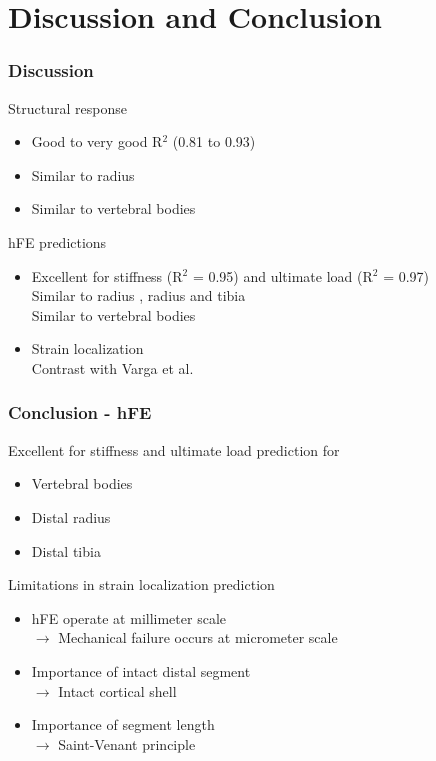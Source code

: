 \documentclass[xcolor=table,11pt]{beamer}
\begin{document}
	
	\section{Discussion and Conclusion}

	\begin{frame}
		\frametitle{Discussion}

		Structural response
		\begin{itemize}
			\item Good to very good R$^2$ (0.81 to 0.93)
			\item Similar to radius \cite{p8}\cite{p9}
			\item Similar to vertebral bodies \cite{p10}\cite{p11}
		\end{itemize}

		\vfill

		hFE predictions
		\begin{itemize}
			\item Excellent for stiffness (R$^2$ = 0.95) and ultimate load (R$^2$ = 0.97)\\Similar to radius \cite{p9}, radius and tibia \cite{p13}\\Similar to vertebral bodies \cite{p10}
			\item Strain localization\\Contrast with Varga et al. \cite{p7}
		\end{itemize}

	\end{frame}
	
	\begin{frame}
		\frametitle{Conclusion - hFE}
		Excellent for stiffness and ultimate load prediction for
		\begin{itemize}
			\item Vertebral bodies
			\item Distal radius
			\item Distal tibia
		\end{itemize}
		
		\vspace{5mm}

		Limitations in strain localization prediction
		\begin{itemize}
			\item hFE operate at millimeter scale\\$\rightarrow$ Mechanical failure occurs at micrometer scale
			\item Importance of intact distal segment\\$\rightarrow$ Intact cortical shell
			\item Importance of segment length\\$\rightarrow$ Saint-Venant principle
		\end{itemize}

	\end{frame}
	
\end{document}
